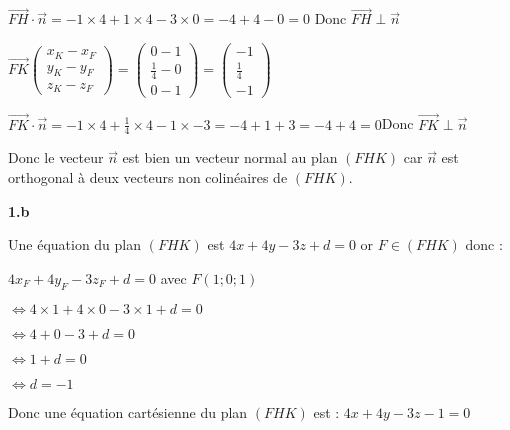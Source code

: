 \documentclass{article}
\begin{document}
\vspace{2mm}
$\overrightarrow{FH} \cdot \overrightarrow{n} = -1\times 4 + 1 \times 4 - 3 \times 0 = -4 + 4 - 0 = 0$ \qquad  Donc $\overrightarrow{FH} \perp \overrightarrow{n}$
\vspace{2mm}

$\overrightarrow{FK}
\begin{pmatrix}
   x_K-x_F\\
   y_K-y_F\\
   z_K-z_F
\end{pmatrix}
=
\begin{pmatrix}
   0-1\\
   \frac{1}{4}-0\\
   0-1
\end{pmatrix}
= 
\begin{pmatrix}
   -1\\
   \frac{1}{4}\\
   -1
\end{pmatrix}
$
\vspace{2mm}

$\overrightarrow{FK} \cdot \overrightarrow{n} = -1 \times 4 + \frac{1}{4} \times 4 - 1 \times -3 = -4+1+3 = -4+4 = 0$\qquad Donc $\overrightarrow{FK} \perp \overrightarrow{n}$
\vspace{2mm}

\noindent Donc le vecteur $\overrightarrow{n}$ est bien un vecteur normal au plan $(FHK)$ car $\overrightarrow{n}$ est orthogonal à deux vecteurs non colinéaires de $(FHK)$. 

\vspace{2mm}

\textbf{1.b}

\vspace{2mm}

\noindent Une équation du plan $(FHK)$ est $4x+4y-3z+d=0$ or $F \in (FHK)$ donc :

\vspace{2mm}

$4x_F + 4y_F - 3z_F + d = 0$ \qquad avec $F(1; 0; 1)$

$\Leftrightarrow 4 \times 1 + 4 \times 0 - 3 \times 1 + d = 0$

$\Leftrightarrow 4+0-3+d=0$

$\Leftrightarrow 1+d = 0$

$\Leftrightarrow d = -1$

\vspace{2mm}

\noindent Donc une équation cartésienne du plan $(FHK)$ est : $4x + 4y - 3z - 1 = 0$
\end{document}
